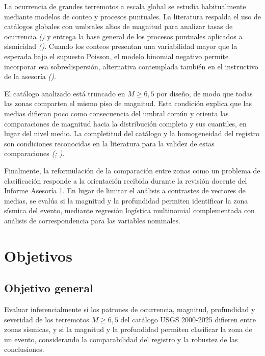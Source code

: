 \documentclass[
  spanish,
  letterpaper,
  DIV=11,
  numbers=noendperiod]{scrartcl}
\begin{document}
La ocurrencia de grandes terremotos a escala global se estudia
habitualmente mediante modelos de conteo y procesos puntuales. La
literatura respalda el uso de catálogos globales con umbrales altos de
magnitud para analizar tasas de ocurrencia
\emph{()} y
entrega la base general de los procesos puntuales aplicados a sismicidad
\emph{()}. Cuando los conteos
presentan una variabilidad mayor que la esperada bajo el supuesto
Poisson, el modelo binomial negativo permite incorporar esa
sobredispersión, alternativa contemplada también en el instructivo de la
asesoría \emph{()}.

El catálogo analizado está truncado en \(M \geq 6{,}5\) por diseño, de
modo que todas las zonas comparten el mismo piso de magnitud. Esta
condición explica que las medias difieran poco como consecuencia del
umbral común y orienta las comparaciones de magnitud hacia la
distribución completa y sus cuantiles, en lugar del nivel medio. La
completitud del catálogo y la homogeneidad del registro son condiciones
reconocidas en la literatura para la validez de estas comparaciones
\emph{(;
)}.

Finalmente, la reformulación de la comparación entre zonas como un
problema de clasificación responde a la orientación recibida durante la
revisión docente del Informe Asesoría 1. En lugar de limitar el análisis
a contrastes de vectores de medias, se evalúa si la magnitud y la
profundidad permiten identificar la zona sísmica del evento, mediante
regresión logística multinomial complementada con análisis de
correspondencia para las variables nominales.

\section{Objetivos}\label{objetivos}

\subsection{Objetivo general}\label{objetivo-general}

Evaluar inferencialmente si los patrones de ocurrencia, magnitud,
profundidad y severidad de los terremotos \(M \geq 6{,}5\) del catálogo
USGS 2000-2025 difieren entre zonas sísmicas, y si la magnitud y la
profundidad permiten clasificar la zona de un evento, considerando la
comparabilidad del registro y la robustez de las conclusiones.
\end{document}
